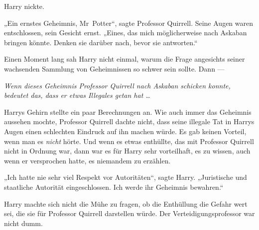 Harry nickte.

„Ein ernstes Geheimnis, Mr~Potter“, sagte Professor Quirrell. Seine Augen waren entschlossen, sein Gesicht ernst.
„Eines, das mich möglicherweise nach Askaban bringen könnte. Denken sie darüber nach, bevor sie antworten.“

Einen Moment lang sah Harry nicht einmal, warum die Frage angesichts seiner wachsenden Sammlung von Geheimnissen so schwer sein sollte. Dann —

\emph{Wenn dieses Geheimnis Professor Quirrell nach Askaban schicken konnte, bedeutet das, dass er etwas Illegales getan hat …}

Harrys Gehirn stellte ein paar Berechnungen an. Wie auch immer das Geheimnis aussehen mochte, Professor Quirrell dachte nicht, dass seine illegale Tat in Harrys Augen einen schlechten Eindruck auf ihn machen würde. Es gab keinen Vorteil, wenn man es \emph{nicht} hörte. Und wenn es etwas enthüllte, das mit Professor Quirrell nicht in Ordnung war, dann war es für Harry sehr vorteilhaft, es zu wissen, auch wenn er versprochen hatte, es niemandem zu erzählen.

„Ich hatte nie sehr viel Respekt vor Autoritäten“, sagte Harry.
„Juristische und staatliche Autorität eingeschlossen. Ich werde ihr Geheimnis bewahren.“

Harry machte sich nicht die Mühe zu fragen, ob die Enthüllung die Gefahr wert sei, die sie für Professor Quirrell darstellen würde. Der Verteidigungsprofessor war nicht dumm.

